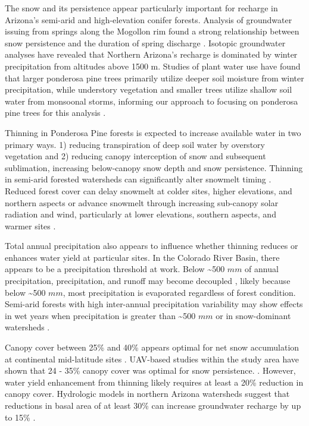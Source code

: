 \documentclass[
  number,
  preprint,
  3p,
  onecolumn]{elsarticle}
\begin{document}
The snow and its persistence appear particularly important for recharge
in Arizona's semi-arid and high-elevation conifer forests. Analysis of
groundwater issuing from springs along the Mogollon rim found a strong
relationship between snow persistence and the duration of spring
discharge \citep{donovan2022}. Isotopic groundwater analyses have
revealed that Northern Arizona's recharge is dominated by winter
precipitation from altitudes above 1500
m\citep{eastoe2007, eastoe2023, earman2006, blasch2006}. Studies of
plant water use have found that larger ponderosa pine trees primarily
utilize deeper soil moisture from winter precipitation, while understory
vegetation and smaller trees utilize shallow soil water from monsoonal
storms, informing our approach to focusing on ponderosa pine trees for
this analysis \citep{kerhoulas2013, kerhoulas2023}.

Thinning in Ponderosa Pine forests is expected to increase available
water in two primary ways. 1) reducing transpiration of deep soil water
by overstory vegetation and 2) reducing canopy interception of snow and
subsequent sublimation, increasing below-canopy snow depth and snow
persistence. Thinning in semi-arid forested watersheds can significantly
alter snowmelt timing \citep{dwivedi2024}. Reduced forest cover can
delay snowmelt at colder sites, higher elevations, and northern aspects
or advance snowmelt through increasing sub-canopy solar radiation and
wind, particularly at lower elevations, southern aspects, and warmer
sites \citep{biederman_recent_2015, dwivedi2024}.

Total annual precipitation also appears to influence whether thinning
reduces or enhances water yield at particular sites. In the Colorado
River Basin, there appears to be a precipitation threshold at work.
Below \textasciitilde500 \(mm\) of annual precipitation, precipitation,
and runoff may become decoupled \citep{biederman2022}, likely because
below \textasciitilde500 \(mm\), most precipitation is evaporated
regardless of forest condition. Semi-arid forests with high inter-annual
precipitation variability may show effects in wet years when
precipitation is greater than \textasciitilde500 \(mm\) or in
snow-dominant watersheds
\citep{adams_ecohydrological_2012, carroll_evaluating_2016}.

Canopy cover between 25\% and 40\% appears optimal for net snow
accumulation at continental mid-latitude sites \citep{veatch2009}.
UAV-based studies within the study area have shown that 24 - 35\% canopy
cover was optimal for snow persistence.
\citep{donager2021, sankey_multi-scale_2015, belmonte2021}. However,
water yield enhancement from thinning likely requires at least a 20\%
reduction in canopy cover\citep{adams_ecohydrological_2012}. Hydrologic
models in northern Arizona watersheds suggest that reductions in basal
area of at least 30\% can increase groundwater recharge by up to 15\%
\citep{wyatt2015}.
\end{document}
